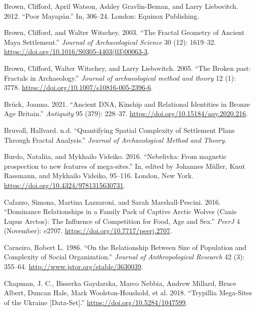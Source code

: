 \documentclass[
  12pt,
  a4paper, twoside]{book}
\newlength{\cslhangindent}
\newlength{\cslentryspacingunit} %
\newenvironment{CSLReferences}[2] %
 {%
  \setlength{\parindent}{0pt}
  \ifodd #1
  \let\oldpar\par
  \def\par{\hangindent=\cslhangindent\oldpar}
  \fi
  \setlength{\parskip}{#2\cslentryspacingunit}
 }%
 {}
\begin{document}
\begin{CSLReferences}{1}{0}
\leavevmode{}%
Brown, Clifford, April Watson, Ashley Gravlin-Beman, and Larry Liebovitch. 2012. {``Poor Mayapán.''} In, 306--24. London: Equinox Publishing.

\leavevmode{}%
Brown, Clifford, and Walter Witschey. 2003. {``The Fractal Geometry of Ancient Maya Settlement.''} \emph{Journal of Archaeological Science} 30 (12): 1619--32. \url{https://doi.org/10.1016/S0305-4403(03)00063-3}.

\leavevmode{}%
Brown, Clifford, Walter Witschey, and Larry Liebovitch. 2005. {``The Broken past: Fractals in Archaeology.''} \emph{Journal of archaeological method and theory} 12 (1): 3778. \url{https://doi.org/10.1007/s10816-005-2396-6}.

\leavevmode{}%
Brück, Joanna. 2021. {``Ancient DNA, Kinship and Relational Identities in Bronze Age Britain.''} \emph{Antiquity} 95 (379): 228--37. \url{https://doi.org/10.15184/aqy.2020.216}.

\leavevmode{}%
Bruvoll, Hallvard. n.d. {``Quantifying Spatial Complexity of Settlement Plans Through Fractal Analysis.''} \emph{Journal of Archaeological Method and Theory}.

\leavevmode{}%
Burdo, Nataliia, and Mykhailo Videiko. 2016. {``Nebelivka: From magnetic prospection to new features of mega-sites.''} In, edited by Johannes Müller, Knut Rassmann, and Mykhailo Videiko, 95--116. London, New York. \url{https://doi.org/10.4324/9781315630731}.

\leavevmode{}%
Cafazzo, Simona, Martina Lazzaroni, and Sarah Marshall-Pescini. 2016. {``Dominance Relationships in a Family Pack of Captive Arctic Wolves (Canis Lupus Arctos): The Influence of Competition for Food, Age and Sex.''} \emph{PeerJ} 4 (November): e2707. \url{https://doi.org/10.7717/peerj.2707}.

\leavevmode{}%
Carneiro, Robert L. 1986. {``On the Relationship Between Size of Population and Complexity of Social Organization.''} \emph{Journal of Anthropological Research} 42 (3): 355--64. \url{http://www.jstor.org/stable/3630039}.

\leavevmode{}%
Chapman, J. C., Bisserka Gaydarska, Marco Nebbia, Andrew Millard, Bruce Albert, Duncan Hale, Mark Woolston-Houshold, et al. 2018. {``Trypillia Mega-Sites of the Ukraine {[}Data-Set{]}.''} \url{https://doi.org/10.5284/1047599}.


\end{CSLReferences}
\end{document}
